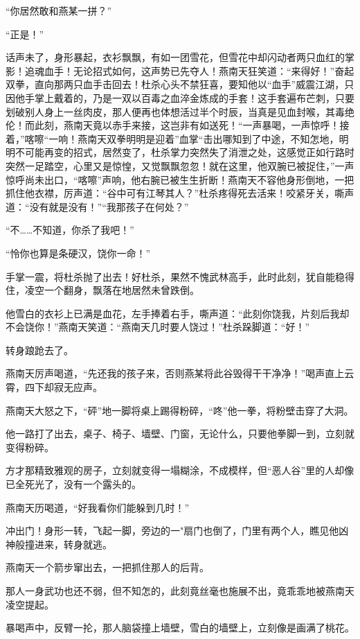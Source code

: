 \documentclass[12pt,oneside]{book}
\begin{document}
``你居然敢和燕某一拼？''

``正是！''

话声未了，身形暴起，衣衫飘飘，有如一团雪花，但雪花中却闪动者两只血红的掌影！追魂血手！无论招式如何，这声势已先夺人！燕南天狂笑道：``来得好！''奋起双拳，直向那两只血手击回去！杜杀心头不禁狂喜，要知他以``血手''威震江湖，只因他手掌上戴着的，乃是一双以百毒之血淬金炼成的手套！这手套遍布芒刺，只要划破别人身上一丝肉皮，那人便再也体想活过半个时辰，当真是见血封喉，其毒绝伦！而此刻，燕南天竟以赤手来接，这岂非有如送死！``一声暴喝，一声惊呼！接着，''喀嚓``一响！燕南天双拳明明是迎着''血掌``击出哪知到了中途，不知怎地，明明不可能再变的招式，居然变了，杜杀掌力突然失了消泄之处，这感觉正如行路时突然一足踏空，心里又是惊惶，又觉飘飘忽忽！就在这里，他双腕已被捉住，''一声惊呼尚未出口，``喀嚓''声响，他右腕已被生生折断！燕南天不容他身形倒地，一把抓住他衣襟，厉声道：``谷中可有江琴其人？''杜杀疼得死去活来！咬紧牙关，嘶声道：``没有就是没有！''``我那孩子在何处？''

``不\ldots\ldots 不知道，你杀了我吧！''

``怜你也算是条硬汉，饶你一命！''

手掌一震，将杜杀抛了出去！好杜杀，果然不愧武林高手，此时此刻，犹自能稳得住，凌空一个翻身，飘落在地居然未曾跌倒。

他雪白的衣衫上已满是血花，左手捧着右手，嘶声道：``此刻你饶我，片刻后我却不会饶你！''燕南天笑道：``燕南天几时要人饶过！''杜杀跺脚道：``好！''

转身踉跄去了。

燕南天厉声喝道，``先还我的孩子来，否则燕某将此谷毁得干干净净！''喝声直上云霄，四下却寂无应声。

燕南天大怒之下，``砰''地一脚将桌上踢得粉碎，``咚''他一拳，将粉壁击穿了大洞。

他一路打了出去，桌子、椅子、墙壁、门窗，无论什么，只要他拳脚一到，立刻就变得粉碎。

方才那精致雅观的房子，立刻就变得一塌糊涂，不成模样，但``恶人谷''里的人却像已全死光了，没有一个露头的。

燕南天历喝道，``好我看你们能躲到几时！''

冲出门！身形一转，飞起一脚，旁边的一"扇门也倒了，门里有两个人，瞧见他凶神般撞进来，转身就逃。

燕南天一个箭步窜出去，一把抓住那人的后背。

那人一身武功也还不弱，但不知怎的，此刻竟丝毫也施展不出，竟乖乖地被燕南天凌空提起。

暴喝声中，反臂一抡，那人脑袋撞上墙壁，雪白的墙壁上，立刻像是画满了桃花。
\end{document}
